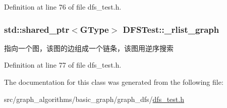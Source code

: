 Definition at line 76 of file dfs\+\_\+test.\+h.

\hypertarget{class_d_f_s_test_a93a79d0654eb82517990c8f5419148a8}{}
\subsubsection[{\+\_\+rlist\+\_\+graph}]{\setlength{\rightskip}{0pt plus 5cm}std\+::shared\+\_\+ptr$<${\bf G\+Type}$>$ D\+F\+S\+Test\+::\+\_\+rlist\+\_\+graph\hspace{0.3cm}{\ttfamily [protected]}}\label{class_d_f_s_test_a93a79d0654eb82517990c8f5419148a8}
指向一个图，该图的边组成一个链条，该图用逆序搜索 

Definition at line 77 of file dfs\+\_\+test.\+h.



The documentation for this class was generated from the following file\+:\begin{DoxyCompactItemize}
\item 
src/graph\+\_\+algorithms/basic\+\_\+graph/graph\+\_\+dfs/\hyperlink{dfs__test_8h}{dfs\+\_\+test.\+h}\end{DoxyCompactItemize}
